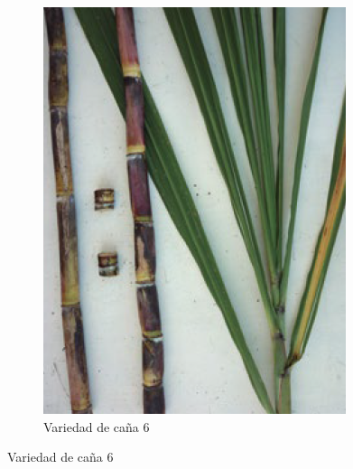 \documentclass{article}%
\begin{document}
\begin{figure}[h!]
\begin{subfigure}{0.33\linewidth}
\includegraphics[width=0.95\linewidth]{Cana/CC84-75.png}%
\caption{Variedad de caña 6}%
\end{subfigure}%
\linebreak%
\newpage%
\end{figure}

%
\end{document}
